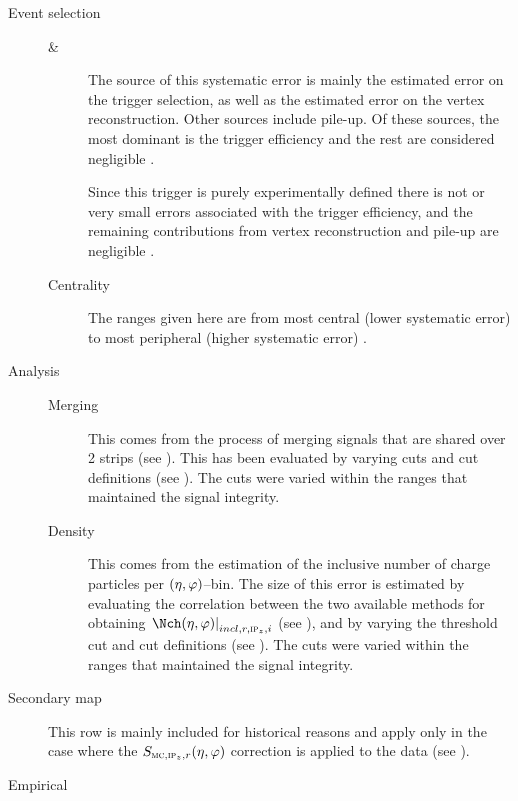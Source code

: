 \begin{description}
\item[Event selection] \hbox{}\hfill
  \begin{description}
  \item[\INEL{} \& \NSD{}] The source of this systematic error is
    mainly the estimated error on the trigger selection, as well as
    the estimated error on the vertex reconstruction.  Other sources
    include pile-up.  Of these sources, the most dominant is the
    trigger efficiency and the rest are considered negligible
    \cite{pwgud:2015}.
  \item[\INELGT{}] Since this trigger is purely experimentally defined
    there is not or very small errors associated with the trigger
    efficiency, and the remaining contributions from vertex
    reconstruction and pile-up are negligible \cite{pwgud:2015}.
  \item[Centrality] The ranges given here are from most central (lower
    systematic error) to most peripheral (higher systematic error)
    \cite{Adam:2014qja,PbPbCent:XXX}.
  \end{description}
\item[Analysis] \hbox{}\hfill
  \begin{description}
  \item[Merging] This comes from the process of merging signals that
    are shared over 2 strips (see ).
    This has been evaluated by varying cuts and cut definitions (see
    ). The cuts were varied within the ranges that
    maintained the signal integrity.
  \item[Density] This comes from the estimation of the inclusive
    number of charge particles per $(\eta,\varphi)$--bin.  The size of this
    error is estimated by evaluating the correlation between the two
    available methods for obtaining $\dndetadphi[incl,r,\subIPz,i]$
    (see ), and by varying the
    threshold cut and cut definitions (see ).  The
    cuts were varied within the ranges that maintained the signal
    integrity. 
  \end{description}
\item[Secondary map] This row is mainly included for historical
  reasons and apply only in the case where the $\SecMap$ correction is
  applied to the data (see ). 
\item[Empirical] \hbox{}\hfill 
  \begin{description}

\end{description}
\end{description}
